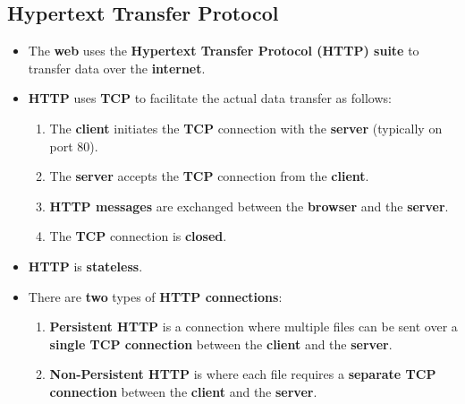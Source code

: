 \documentclass{article}
\begin{document}
    \subsection*{Hypertext Transfer Protocol}
    \begin{itemize}
        \item The \textbf{web} uses the \textbf{Hypertext Transfer Protocol (HTTP) suite} to transfer data over the \textbf{internet}.
            \item \textbf{HTTP} uses \textbf{TCP} to facilitate the actual data transfer as follows:
            \begin{enumerate}
                \item The \textbf{client} initiates the \textbf{TCP} connection with the \textbf{server} (typically on port 80).
                \item The \textbf{server} accepts the \textbf{TCP} connection from the \textbf{client}.
                \item \textbf{HTTP messages} are exchanged between the \textbf{browser} and the \textbf{server}.
                \item The \textbf{TCP} connection is \textbf{closed}.
            \end{enumerate}
        \item \textbf{HTTP} is \textbf{stateless}.
        \item There are \textbf{two} types of \textbf{HTTP connections}:
        \begin{enumerate}
            \item \textbf{Persistent HTTP} is a connection where multiple files can be sent over a \textbf{single TCP connection} between the \textbf{client} and the \textbf{server}.
            \item \textbf{Non-Persistent HTTP} is where each file requires a \textbf{separate TCP connection} between the \textbf{client} and the \textbf{server}. 
        \end{enumerate}

    \end{itemize}
\end{document}
